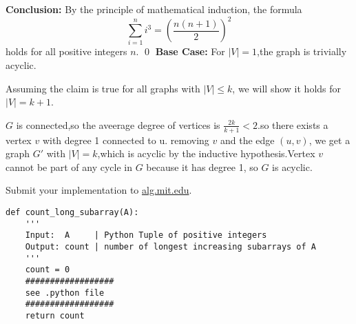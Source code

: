 \documentclass[12pt,twoside]{article}
\begin{document}
\begin{problems}
\medskip

\textbf{Conclusion:} By the principle of mathematical induction, the formula
\[
\sum_{i=1}^n i^3 = \left( \frac{n(n+1)}{2} \right)^2
\]
holds for all positive integers $n$. \qed
\newpage
\problem  %
\textbf{Base Case:} For $|V| = 1$,the graph is trivially acyclic.\par
Assuming the claim is true for all graphs with $|V| \leq k$, we will show it holds for $|V| = k+1$.\par
$G$ is connected,so the aveerage degree of vertices is $\frac{2k}{k+1}<2$.so there exists a vertex $v$ with degree 1 connected to u.
removing $v$ and the edge $(u,v)$, we get a graph $G'$ with $|V| = k$,which is acyclic by the inductive hypothesis.Vertex $v$ cannot be part of any cycle in $G$ because it has degree 1, so $G$ is acyclic.


\vfill
\problem  %
Submit your implementation to {\small\url{alg.mit.edu}}.

\begin{lstlisting}
def count_long_subarray(A):
    '''
    Input:  A     | Python Tuple of positive integers
    Output: count | number of longest increasing subarrays of A
    '''
    count = 0
    ##################
    see .python file
    ##################
    return count
\end{lstlisting}

\end{problems}
\end{document}
